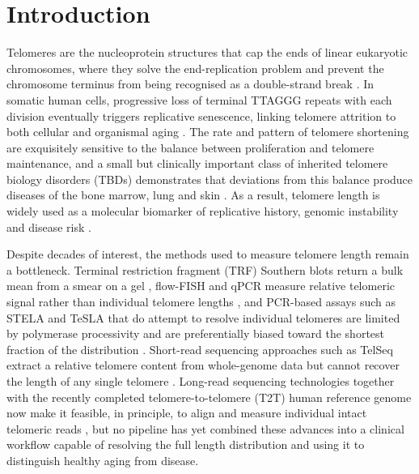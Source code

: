 \section{Introduction}

Telomeres are the nucleoprotein structures that cap the ends of linear eukaryotic chromosomes, where they solve the end-replication problem and prevent the chromosome terminus from being recognised as a double-strand break \cite{delange2005shelterin,palm2008howshelterin}. In somatic human cells, progressive loss of terminal TTAGGG repeats with each division eventually triggers replicative senescence, linking telomere attrition to both cellular and organismal aging \cite{harley1990telomeres,blackburn2006human}. The rate and pattern of telomere shortening are exquisitely sensitive to the balance between proliferation and telomere maintenance, and a small but clinically important class of inherited telomere biology disorders (TBDs) demonstrates that deviations from this balance produce diseases of the bone marrow, lung and skin \cite{armanios2012telomeres,bertuch2016molecular}. As a result, telomere length is widely used as a molecular biomarker of replicative history, genomic instability and disease risk \cite{blackburn2006human,aubert2012telomere}.

Despite decades of interest, the methods used to measure telomere length remain a bottleneck. Terminal restriction fragment (TRF) Southern blots return a bulk mean from a smear on a gel \cite{aubert2012telomere}, flow-FISH and qPCR measure relative telomeric signal rather than individual telomere lengths \cite{baerlocher2006flow,cawthon2002telomere}, and PCR-based assays such as STELA and TeSLA that do attempt to resolve individual telomeres are limited by polymerase processivity and are preferentially biased toward the shortest fraction of the distribution \cite{baird2003extensive,lai2018comparison}. Short-read sequencing approaches such as TelSeq extract a relative telomere content from whole-genome data but cannot recover the length of any single telomere \cite{ding2014telseq}. Long-read sequencing technologies together with the recently completed telomere-to-telomere (T2T) human reference genome now make it feasible, in principle, to align and measure individual intact telomeric reads \cite{nurk2022complete,tham2023comprehensive,schmidt2023targeted,karimian2024human}, but no pipeline has yet combined these advances into a clinical workflow capable of resolving the full length distribution and using it to distinguish healthy aging from disease.

